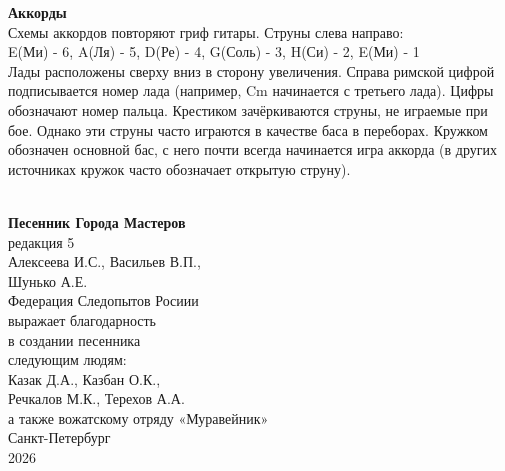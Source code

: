 \documentclass[fleqn,a5paper,12pt,twoside]{guitartabs}
\begin{document}
\textbf{Аккорды}\\
Схемы аккордов повторяют гриф гитары. Струны слева направо:\\
E(Ми) - 6, A(Ля) - 5, D(Ре) - 4, G(Соль) - 3, H(Си) - 2, E(Ми) - 1\\ 
Лады расположены сверху вниз в сторону увеличения. Справа римской цифрой подписывается номер лада (например, Cm начинается с третьего лада). Цифры обозначают номер пальца. Крестиком зачёркиваются струны, не играемые при бое. Однако эти струны часто играются в качестве баса в переборах. Кружком обозначен основной бас, с него почти всегда начинается игра аккорда (в других источниках кружок часто обозначает открытую струну).\vspace{7mm}\\
\muschordscheme[
name      = Am ,
position  = I,
finger    = {1/2:1, 2/3:3, 2/4:2},
ring      = {5},
mute = {6}
]
\muschordscheme[
name      = Cm ,
position  = III,
barre = 1/1-5: ,
finger    = {2/2:2, 3/3:4, 3/4:3},
ring      = {5},
mute = {6}
]\\
\newpage
\tableofcontents
\begin{titlepage}
   \begin{center}
       \vspace*{3cm}
       \textbf{\Large Песенник Города Мастеров}\\
       {\large редакция 5}\\
       \vspace{1cm}
        Алексеева И.С., Васильев В.П.,\\
         Шунько А.Е.\\
        \vspace{2cm}
        Федерация Следопытов Росиии\\ 
        выражает благодарность\\
        в создании песенника\\
         следующим людям:\\
        \medskip
        Казак Д.А., Казбан О.К.,\\
        Речкалов М.К., Терехов А.А.\\
        а также вожатскому отряду «Муравейник» \\
       \vfill
        Санкт-Петербург\\ 
        2026
   \end{center}
\end{titlepage}
\end{document}
